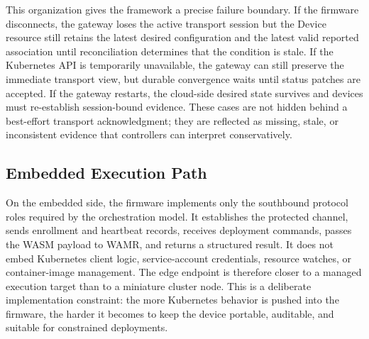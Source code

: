 This organization gives the framework a precise failure boundary. If the firmware disconnects, the gateway loses the active transport session but the Device resource still retains the latest desired configuration and the latest valid reported association until reconciliation determines that the condition is stale. If the Kubernetes API is temporarily unavailable, the gateway can still preserve the immediate transport view, but durable convergence waits until status patches are accepted. If the gateway restarts, the cloud-side desired state survives and devices must re-establish session-bound evidence. These cases are not hidden behind a best-effort transport acknowledgment; they are reflected as missing, stale, or inconsistent evidence that controllers can interpret conservatively.


\subsection{Embedded Execution Path}
On the embedded side, the firmware implements only the southbound protocol roles required by the orchestration model. It establishes the protected channel, sends enrollment and heartbeat records, receives deployment commands, passes the WASM payload to WAMR, and returns a structured result. It does not embed Kubernetes client logic, service-account credentials, resource watches, or container-image management. The edge endpoint is therefore closer to a managed execution target than to a miniature cluster node. This is a deliberate implementation constraint: the more Kubernetes behavior is pushed into the firmware, the harder it becomes to keep the device portable, auditable, and suitable for constrained deployments.

